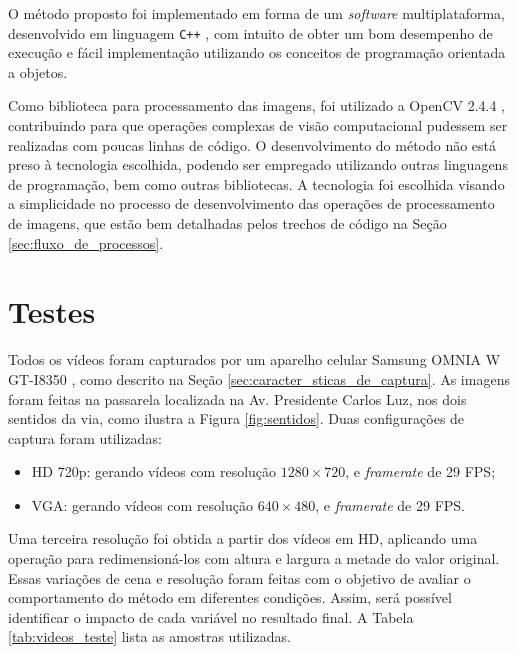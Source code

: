 
O método proposto foi implementado em forma de um \textit{software} multiplataforma, desenvolvido em linguagem \verb!C++! \citep{cplusplus:2013:online}, com intuito de obter um bom desempenho de execução e fácil implementação utilizando os conceitos de programação orientada a objetos.

Como biblioteca para processamento das imagens, foi utilizado a OpenCV 2.4.4 \citep{opencv_library}, contribuindo para que operações complexas de visão computacional pudessem ser realizadas com poucas linhas de código. O desenvolvimento do método não está preso à tecnologia escolhida, podendo ser empregado utilizando outras linguagens de programação, bem como outras bibliotecas. A tecnologia foi escolhida visando a simplicidade no processo de desenvolvimento das operações de processamento de imagens, que estão bem detalhadas pelos trechos de código na Seção \ref{sec:fluxo_de_processos}.

\section{Testes} %
\label{sec:testes}

Todos os vídeos foram capturados por um aparelho celular Samsung OMNIA W GT-I8350 \citep{omnia:2013:online}, como descrito na Seção \ref{sec:caracter_sticas_de_captura}. As imagens foram feitas na passarela localizada na Av. Presidente Carlos Luz, nos dois sentidos da via, como ilustra a Figura \ref{fig:sentidos}. Duas configurações de captura foram utilizadas:

\begin{itemize}
  \item HD 720p: gerando vídeos com resolução $1280\times 720$, e \textit{framerate} de 29 FPS;
  \item VGA: gerando vídeos com resolução $640\times 480$, e \textit{framerate} de 29 FPS.
\end{itemize}

\noindent Uma terceira resolução foi obtida a partir dos vídeos em HD, aplicando uma operação para redimensioná-los com altura e largura a metade do valor original. Essas variações de cena e resolução foram feitas com o objetivo de avaliar o comportamento do método em diferentes condições. Assim, será possível identificar o impacto de cada variável no resultado final. A Tabela \ref{tab:videos_teste} lista as amostras utilizadas.

